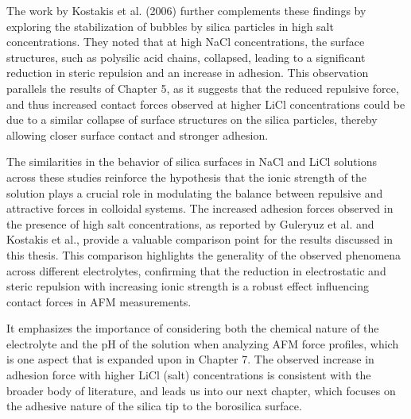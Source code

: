 The work by Kostakis et al. (2006) further complements these findings by exploring the stabilization of bubbles by silica particles in high salt concentrations. They noted that at high NaCl concentrations, the surface structures, such as polysilic acid chains, collapsed, leading to a significant reduction in steric repulsion and an increase in adhesion. This observation parallels the results of Chapter 5, as it suggests that the reduced repulsive force, and thus increased contact forces observed at higher LiCl concentrations could be due to a similar collapse of surface structures on the silica particles, thereby allowing closer surface contact and stronger adhesion.  \cite{Kostakis2006} 

The similarities in the behavior of silica surfaces in NaCl and LiCl solutions across these studies reinforce the hypothesis that the ionic strength of the solution plays a crucial role in modulating the balance between repulsive and attractive forces in colloidal systems. The increased adhesion forces observed in the presence of high salt concentrations, as reported by Guleryuz et al. and Kostakis et al., provide a valuable comparison point for the results discussed in this thesis. This comparison highlights the generality of the observed phenomena across different electrolytes, confirming that the reduction in electrostatic and steric repulsion with increasing ionic strength is a robust effect influencing contact forces in AFM measurements.

It emphasizes the importance of considering both the chemical nature of the electrolyte and the pH of the solution when analyzing AFM force profiles, which is one aspect that is expanded upon in Chapter 7. The observed increase in adhesion force with higher LiCl (salt) concentrations is consistent with the broader body of literature, and leads us into our next chapter, which focuses on the adhesive nature of the silica tip to the borosilica surface.

